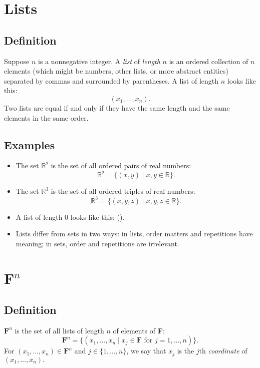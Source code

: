\documentclass[11pt]{article}
\begin{document}
    \pagebreak

    \section{Lists}

    \subsection{Definition}

    Suppose $n$ is a nonnegative integer. A \emph{list} of \emph{length} $n$ is an ordered collection of $n$ elements (which might be numbers, other lists, or more abstract entities) separated by commas and surrounded by parentheses. A list of length $n$ looks like this: \[(x_1, \dots, x_n).\] Two lists are equal if and only if they have the same length and the same elements in the same order.

    \subsection{Examples}
    \begin{itemize}
        \item The set \(\mathbb{R}^2\) is the set of all ordered pairs of real numbers: \[\mathbb{R}^2 = \{(x,y) \mid x,y \in \mathbb{R}\}.\]
        \item The set \(\mathbb{R}^3\) is the set of all ordered triples of real numbers: \[\mathbb{R}^3 = \{(x,y,z) \mid x,y,z \in \mathbb{R}\}.\]
        \item A list of length 0 looks like this: ().
        \item Lists differ from sets in two ways: in lists, order matters and repetitions have meaning; in sets, order and repetitions are irrelevant.
    \end{itemize}

    \pagebreak

    \section{\textbf{F}\(^n\)}

    \subsection{Definition}

    \(\textbf{F}^n\) is the set of all lists of length $n$ of elements of \textbf{F}: \[\textbf{F}^n = \{(x_1, \dots, x_n \mid x_j \in \textbf{F} \text{ for } j = 1, \dots, n)\}.\] For \((x_1, \dots, x_n) \in \textbf{F}^n\) and \(j \in \{1, \dots, n\}\), we say that \(x_j\) is the $j$th \emph{coordinate} of \((x_1, \dots, x_n).\)
\end{document}
